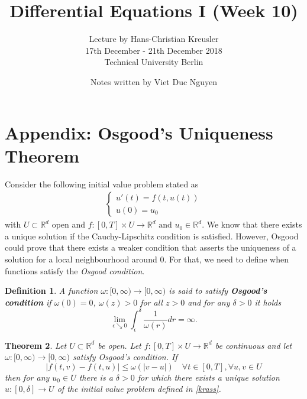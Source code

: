 \documentclass[a4paper, 11pt]{article}
\newtheorem{theorem}{Theorem}
\newtheorem{definition}[theorem]{Definition}
\begin{document}
\title{Differential Equations I (Week 10) }
\author{ Lecture by Hans-Christian Kreusler \\ 17th December - 21th December 2018 \\ Technical University Berlin}
\date{ Notes written by Viet Duc Nguyen}
\maketitle

\section*{Appendix: Osgood's Uniqueness Theorem}
Consider the following initial value problem stated as
\begin{align}\label{krass}
\begin{cases}
u'(t) = f(t,u(t)) \\ u(0) = u_0
\end{cases}
\end{align}
with $U \subset \mathbb R^d$ open and $f: [0,T] \times U \to \mathbb R^d \text{ and } u_0 \in \mathbb R^d$. We know that there exists a unique solution if the Cauchy-Lipschitz condition is satisfied. However, Osgood could prove that there exists a weaker condition that asserts the uniqueness of a solution for a local neighbourhood around $0$. For that, we need to define when functions	 satisfy the \emph{Osgood condition}. 

\begin{definition}
	A function $\omega: [0, \infty) \to [0,\infty)$ is said to satisfy \textbf{Osgood's condition} if $\omega(0) = 0$, $\omega(z) > 0$ for all $z > 0$ and for any $\delta > 0$ it holds
	\[
	\lim_{\epsilon \searrow 0} \int^{\delta}_{\epsilon} \frac{1}{\omega(r)}dr = \infty.
	\]
\end{definition}

\begin{theorem}
	Let $U \subset \mathbb R^d$ be open. Let $f: [0,T] \times U \to \mathbb R^d$ be continuous and let $\omega: [0,\infty) \to [0,\infty)$ satisfy Osgood's condition. If 
	\[
	|f(t,v) - f(t,u)| \leq \omega(|v-u|) \quad \forall t \in [0,T], \forall u,v \in U
	\]
	then for any $u_0 \in U$ there is a $\delta > 0$ for which there exists a unique solution $u: [0,\delta] \to U$ of the initial value problem defined in \eqref{krass}.
\end{theorem}
\end{document}
